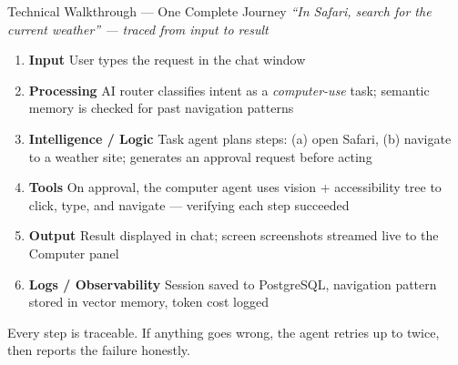 \documentclass[aspectratio=169,11pt]{beamer}
\begin{document}

\begin{frame}{Technical Walkthrough — One Complete Journey}
  \vspace{0.3em}
  {\small\color{subtext}\itshape
    ``In Safari, search for the current weather'' — traced from input to result}
  \vspace{0.5em}

  \begin{enumerate}\small
    \item \textbf{Input} \quad User types the request in the chat window
    \item \textbf{Processing} \quad AI router classifies intent as a
          \emph{computer-use} task; semantic memory is checked for past
          navigation patterns
    \item \textbf{Intelligence / Logic} \quad Task agent plans steps:
          (a) open Safari, (b) navigate to a weather site; generates
          an approval request before acting
    \item \textbf{Tools} \quad On approval, the computer agent uses
          vision + accessibility tree to click, type, and navigate —
          verifying each step succeeded
    \item \textbf{Output} \quad Result displayed in chat; screen
          screenshots streamed live to the Computer panel
    \item \textbf{Logs / Observability} \quad Session saved to PostgreSQL,
          navigation pattern stored in vector memory, token cost logged
  \end{enumerate}

  \vspace{0.3em}
  {\scriptsize\color{subtext}
    Every step is traceable. If anything goes wrong, the agent retries
    up to twice, then reports the failure honestly.}
\end{frame}

\end{document}
